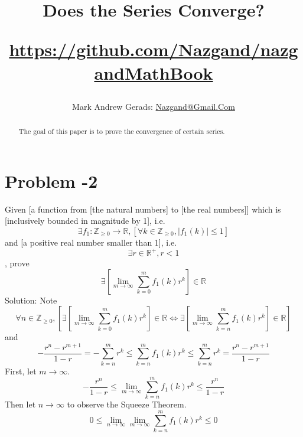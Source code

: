 \documentclass[]{article}
\author{Mark Andrew Gerads: \href{MailTo:Nazgand@Gmail.Com}{Nazgand@Gmail.Com}}
\title{
	Does the Series Converge?
	
	\href{https://github.com/Nazgand/nazgandMathBook}{https://github.com/Nazgand/nazgandMathBook}
}
\newcommand{\pqty}[1]{{\left(#1\right)}}
\newcommand{\bqty}[1]{{\left[#1\right]}}
\newcommand{\abs}[1]{{\left\lvert#1\right\rvert}}
\numberwithin{equation}{section}
\begin{document}
	
	\maketitle
	
	\begin{abstract}
		The goal of this paper is to prove the convergence of certain series.
	\end{abstract}

	\section{Problem -2}
	Given [a function from [the natural numbers] to [the real numbers]] which is [inclusively bounded in magnitude by 1], i.e.
	\begin{equation}
		\exists f_1:\mathbb{Z}_{\geq 0}\to\mathbb{R},
		\bqty{\forall k\in\mathbb{Z}_{\geq 0}, \abs{f_1\pqty{k}}\leq 1}
	\end{equation}
	and [a positive real number smaller than 1], i.e.
	\begin{equation}
		\exists r\in\mathbb{R}^+,
		r<1
	\end{equation}
	, prove
	\begin{equation}
		\exists \bqty{\lim\limits_{m\to\infty}\sum_{k=0}^m{f_1\pqty{k}}r^k}
		\in\mathbb{R}
	\end{equation}
	Solution: Note
	\begin{equation}
		\forall n\in\mathbb{Z}_{\geq 0},\bqty{
			\exists \bqty{\lim\limits_{m\to\infty}\sum_{k=0}^m{f_1\pqty{k}}r^k}
			\in\mathbb{R}
			\Leftrightarrow
			\exists \bqty{\lim\limits_{m\to\infty}\sum_{k=n}^m{f_1\pqty{k}}r^k}
			\in\mathbb{R}
		}
	\end{equation}
	and
	\begin{equation}
		-\frac{r^n-r^{m+1}}{1-r}=-\sum_{k=n}^m r^k\leq\sum_{k=n}^m{f_1\pqty{k}}r^k\leq\sum_{k=n}^m r^k=\frac{r^n-r^{m+1}}{1-r}
	\end{equation}
	First, let $m\to\infty$.
	\begin{equation}
		-\frac{r^n}{1-r}\leq\lim\limits_{m\to\infty}\sum_{k=n}^m{f_1\pqty{k}}r^k\leq\frac{r^n}{1-r}
	\end{equation}
	Then let $n\to\infty$ to observe the Squeeze Theorem.
	\begin{equation}
		0\leq\lim\limits_{n\to\infty}\lim\limits_{m\to\infty}\sum_{k=n}^m{f_1\pqty{k}}r^k\leq 0
	\end{equation}
\end{document}

